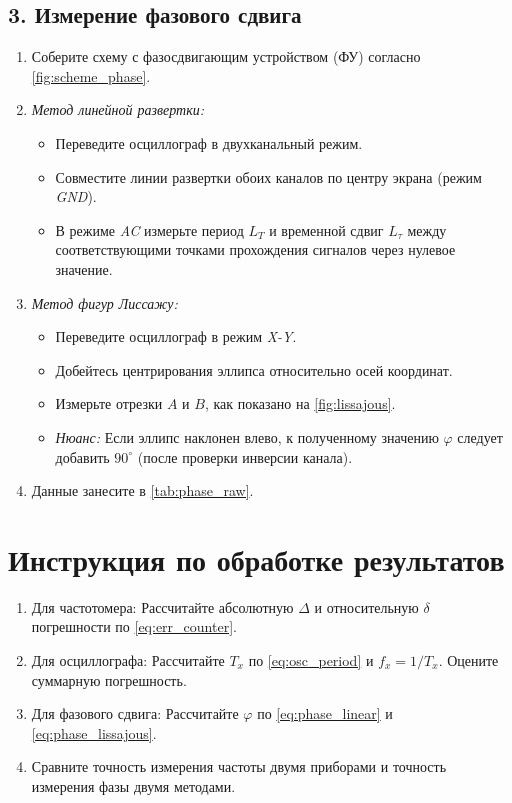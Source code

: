 \subsection*{3. Измерение фазового сдвига}
\begin{enumerate}
    \item Соберите схему с фазосдвигающим устройством (ФУ) согласно \cref{fig:scheme_phase}.
    \item \textit{Метод линейной развертки:}
        \begin{itemize}
            \item Переведите осциллограф в двухканальный режим.
            \item Совместите линии развертки обоих каналов по центру экрана (режим \textit{GND}).
            \item В режиме \textit{AC} измерьте период $L_T$ и временной сдвиг $L_{\tau}$ между соответствующими точками прохождения сигналов через нулевое значение.
        \end{itemize}
    \item \textit{Метод фигур Лиссажу:}
        \begin{itemize}
            \item Переведите осциллограф в режим \textit{X-Y}.
            \item Добейтесь центрирования эллипса относительно осей координат.
            \item Измерьте отрезки $A$ и $B$, как показано на \cref{fig:lissajous}.
            \item \textit{Нюанс:} Если эллипс наклонен влево, к полученному значению $\varphi$ следует добавить $90^\circ$ (после проверки инверсии канала).
        \end{itemize}
    \item Данные занесите в \cref{tab:phase_raw}.
\end{enumerate}

\section*{Инструкция по обработке результатов}
\begin{enumerate}
    \item Для частотомера: Рассчитайте абсолютную $\Delta$ и относительную $\delta$ погрешности по \cref{eq:err_counter}.
    \item Для осциллографа: Рассчитайте $T_x$ по \cref{eq:osc_period} и $f_x = 1/T_x$. Оцените суммарную погрешность.
    \item Для фазового сдвига: Рассчитайте $\varphi$ по \cref{eq:phase_linear} и \cref{eq:phase_lissajous}.
    \item Сравните точность измерения частоты двумя приборами и точность измерения фазы двумя методами.
\end{enumerate}


